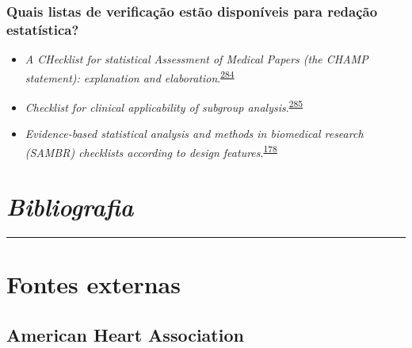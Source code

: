 \documentclass[
  a4paper,
]{book}
\begin{document}
\hypertarget{quais-listas-de-verificauxe7uxe3o-estuxe3o-disponuxedveis-para-redauxe7uxe3o-estatuxedstica}{%
\subsection{Quais listas de verificação estão disponíveis para redação estatística?}\label{quais-listas-de-verificauxe7uxe3o-estuxe3o-disponuxedveis-para-redauxe7uxe3o-estatuxedstica}}

\begin{itemize}
\item
  \emph{A CHecklist for statistical Assessment of Medical Papers (the CHAMP statement): explanation and elaboration}.\textsuperscript{\protect\hyperlink{ref-Mansournia2021}{284}}
\item
  \emph{Checklist for clinical applicability of subgroup analysis}.\textsuperscript{\protect\hyperlink{ref-Gil-Sierra2020}{285}}
\item
  \emph{Evidence-based statistical analysis and methods in biomedical research (SAMBR) checklists according to design features}.\textsuperscript{\protect\hyperlink{ref-dwivedi2019}{178}}
\end{itemize}


\hypertarget{bibliografia}{%
\chapter*{\texorpdfstring{\emph{Bibliografia}}{Bibliografia}}\label{bibliografia}}

\markboth{}{}
\par\noindent\rule{\textwidth}{0.05in}

\hypertarget{fontes-externas}{%
\chapter*{\texorpdfstring{\textbf{Fontes externas}}{Fontes externas}}\label{fontes-externas}}

\hypertarget{american-heart-association}{%
\section*{American Heart Association}\label{american-heart-association}}
\end{document}
